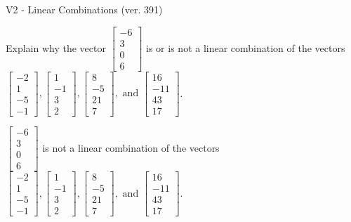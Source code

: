 \begin{exercise}
  \begin{exerciseTitle}V2 - Linear Combinations (ver. 391)\end{exerciseTitle}
  \begin{exerciseStatement}
    Explain why the vector \(\left[\begin{array}{c}
-6 \\
3 \\
0 \\
6
\end{array}\right]\)  is or is not a linear 
	combination of the vectors \(\left[\begin{array}{c}
-2 \\
1 \\
-5 \\
-1
\end{array}\right] , \left[\begin{array}{c}
1 \\
-1 \\
3 \\
2
\end{array}\right] , \left[\begin{array}{c}
8 \\
-5 \\
21 \\
7
\end{array}\right] , \text{ and } \left[\begin{array}{c}
16 \\
-11 \\
43 \\
17
\end{array}\right]\).
	


  \end{exerciseStatement}
  \begin{exerciseAnswer}
   \(\left[\begin{array}{c}
-6 \\
3 \\
0 \\
6
\end{array}\right]\) 
  	 is not  
	a linear combination of the vectors \(\left[\begin{array}{c}
-2 \\
1 \\
-5 \\
-1
\end{array}\right] , \left[\begin{array}{c}
1 \\
-1 \\
3 \\
2
\end{array}\right] , \left[\begin{array}{c}
8 \\
-5 \\
21 \\
7
\end{array}\right] , \text{ and } \left[\begin{array}{c}
16 \\
-11 \\
43 \\
17
\end{array}\right]\).


\end{exerciseAnswer}
\end{exercise}
